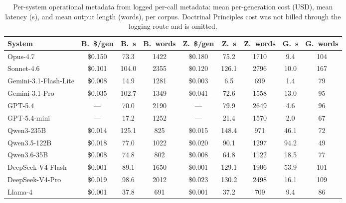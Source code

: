 \begin{table}[t]
\centering\footnotesize
\caption{Per-system operational metadata from logged per-call metadata: mean per-generation cost (USD), mean latency (s), and mean output length (words), per corpus. Doctrinal Principles cost was not billed through the logging route and is omitted.}
\label{tbl-operational}
\setlength{\tabcolsep}{4pt}
\begin{tabular*}{\textwidth}{@{\extracolsep{\fill}}lcccccccc@{}}
\toprule
System & B.~\$/gen & B.~s & B.~words & Z.~\$/gen & Z.~s & Z.~words & G.~s & G.~words \\
\midrule
Opus-4.7 & \$0.150 & 73.3 & 1422 & \$0.180 & 75.2 & 1710 & 9.4 & 104 \\
Sonnet-4.6 & \$0.101 & 104.0 & 2355 & \$0.120 & 126.1 & 2796 & 10.0 & 167 \\
Gemini-3.1-Flash-Lite & \$0.008 & 14.9 & 1281 & \$0.003 & 6.5 & 699 & 1.4 & 79 \\
Gemini-3.1-Pro & \$0.035 & 102.7 & 1349 & \$0.041 & 72.6 & 1558 & 13.0 & 95 \\
GPT-5.4 & — & 70.0 & 2190 & — & 79.9 & 2649 & 4.6 & 96 \\
GPT-5.4-mini & — & 17.2 & 1252 & — & 21.4 & 1570 & 2.0 & 67 \\
Qwen3-235B & \$0.014 & 125.1 & 825 & \$0.015 & 148.4 & 971 & 46.1 & 72 \\
Qwen3.5-122B & \$0.018 & 77.0 & 1022 & \$0.020 & 90.1 & 1297 & 94.2 & 49 \\
Qwen3.6-35B & \$0.008 & 74.8 & 802 & \$0.008 & 64.8 & 1122 & 18.5 & 77 \\
DeepSeek-V4-Flash & \$0.001 & 89.1 & 1650 & \$0.001 & 129.1 & 1906 & 53.9 & 101 \\
DeepSeek-V4-Pro & \$0.019 & 98.6 & 2012 & \$0.023 & 130.2 & 2498 & 16.1 & 109 \\
Llama-4 & \$0.001 & 37.8 & 691 & \$0.001 & 37.2 & 709 & 9.4 & 86 \\
\bottomrule
\end{tabular*}
\end{table}
